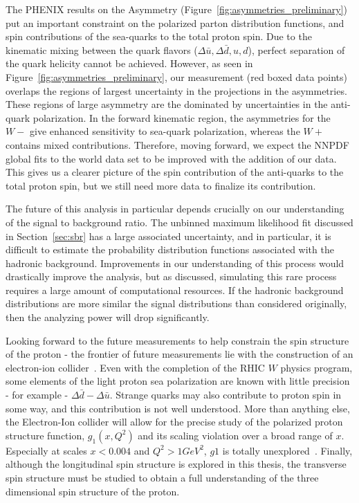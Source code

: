 The PHENIX results on the Asymmetry (Figure~\ref{fig:asymmetries_preliminary})
put an important constraint on the polarized parton distribution functions, and
spin contributions of the sea-quarks to the total proton spin. Due to the
kinematic mixing between the quark flavors ($\Delta\bar{u}, \Delta\bar{d}, u,
d$), perfect separation of the quark helicity cannot be achieved. However, as
seen in Figure~\ref{fig:asymmetries_preliminary}, our measurement (red boxed
data points) overlaps the regions of largest uncertainty in the projections in
the asymmetries. These regions of large asymmetry are the dominated by
uncertainties in the anti-quark polarization. In the forward kinematic region,
the asymmetries for the $W-$ give enhanced sensitivity to sea-quark
polarization, whereas the $W+$ contains mixed contributions. Therefore, moving
forward, we expect the NNPDF global fits to the world data set to be improved
with the addition of our data. This gives us a clearer picture of the spin
contribution of the anti-quarks to the total proton spin, but we still need more
data to finalize its contribution.

The future of this analysis in particular depends crucially on our understanding
of the signal to background ratio. The unbinned maximum likelihood fit discussed
in Section~\ref{sec:sbr} has a large associated uncertainty, and in particular,
it is difficult to estimate the probability distribution functions associated
with the hadronic background. Improvements in our understanding of this process
would drastically improve the analysis, but as discussed, simulating this rare
process requires a large amount of computational resources. If the hadronic
background distributions are more similar the signal distributions than
considered originally, then the analyzing power will drop significantly.

Looking forward to the future measurements to help constrain the spin structure
of the proton - the frontier of future measurements lie with the construction of
an electron-ion collider~\cite{Aschenauer2016}. Even with the completion of the
RHIC $W$ physics program, some elements of the light proton sea polarization are
known with little precision - for example - $\Delta\bar{d}-\Delta\bar{u}$.
Strange quarks may also contribute to proton spin in some way, and this
contribution is not well understood. More than anything else, the Electron-Ion
collider will allow for the precise study of the polarized proton structure
function, $g_1(x,Q^2)$ and its scaling violation over a broad range of $x$.
Especially at scales $x < 0.004$ and $Q^2 > 1 GeV^2$, $g1$ is totally
unexplored~\cite{Accardi2012}. Finally, although the longitudinal spin structure
is explored in this thesis, the transverse spin structure must be studied to
obtain a full understanding of the three dimensional spin structure of the
proton.
